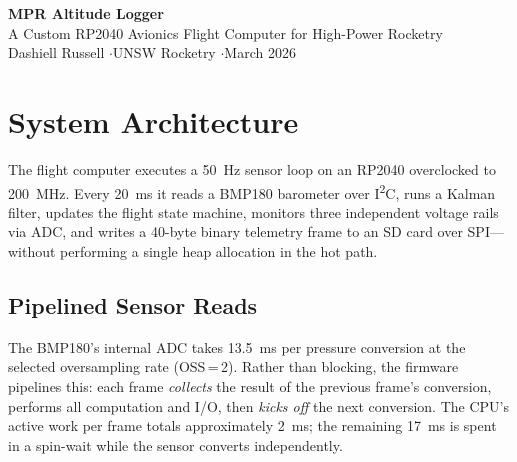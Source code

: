 \documentclass[11pt, a4paper]{article}
\begin{document}
\begin{center}
    {\LARGE\bfseries MPR Altitude Logger}\\[0.4em]
    {\large A Custom RP2040 Avionics Flight Computer for High-Power Rocketry}\\[1em]
    {\normalsize Dashiell Russell \quad$\cdot$\quad UNSW Rocketry \quad$\cdot$\quad March 2026}
\end{center}

\vspace{0.5em}

\begin{abstract}
\noindent
This report presents the design and development of the MPR Altitude Logger, a custom avionics flight computer built on the Raspberry Pi Pico (RP2040) for the Australian Universities Rocketry Challenge 2026. The system runs 1,843 lines of MicroPython firmware at \SI{50}{\hertz} on a microcontroller with \SI{264}{\kilo\byte} of RAM and no hardware floating-point unit, supported by approximately 8,500 lines of ground-station tooling. It implements a pipelined sensor architecture, a Kalman filter for altitude and velocity estimation from barometric pressure alone, a seven-state flight detection system with false-launch recovery, and crash-recoverable binary telemetry logging. Three major firmware revisions were driven by an iterative benchmarking cycle using an eight-test on-device diagnostic suite.
\end{abstract}

\section{System Architecture}

The flight computer executes a \SI{50}{\hertz} sensor loop on an RP2040 overclocked to \SI{200}{\mega\hertz}. Every \SI{20}{\milli\second} it reads a BMP180 barometer over I\textsuperscript{2}C, runs a Kalman filter, updates the flight state machine, monitors three independent voltage rails via ADC, and writes a 40-byte binary telemetry frame to an SD card over SPI---without performing a single heap allocation in the hot path.

\subsection{Pipelined Sensor Reads}

The BMP180's internal ADC takes \SI{13.5}{\milli\second} per pressure conversion at the selected oversampling rate (OSS\,=\,2). Rather than blocking, the firmware pipelines this: each frame \textit{collects} the result of the previous frame's conversion, performs all computation and I/O, then \textit{kicks off} the next conversion. The CPU's active work per frame totals approximately \SI{2}{\milli\second}; the remaining \SI{17}{\milli\second} is spent in a spin-wait while the sensor converts independently.
\end{document}
